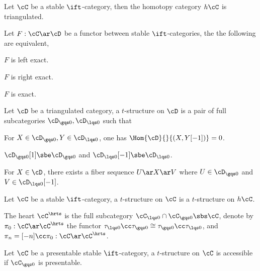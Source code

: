 \documentclass[a4paper, twoside]{article}
\begin{document}
\begin{thm}[1.1.2.14]

    Let $\cC$ be a stable $\ift$-category, then the homotopy category $h\cC$ is triangulated.

\end{thm}

\begin{thm}[1.1.4.1]
    Let $F:\cC\ar\cD$ be a functor between stable $\ift$-categories, the the following are equivalent,
    \begin{enr}[label=(\arabic*)]
        \item $F$ is left exact.
        \item $F$ is right exact.
        \item $F$ is exact.
    \end{enr}
\end{thm}


\begin{dfn}[1.2.1.1]
    Let $\cD$ be a triangulated category, a $t$-structure on $\cD$ is a pair of full subcategories $\cD_{\gqs0},\cD_{\lqs0}$ such that
    \begin{enr}[label=(\arabic*)]
        \item For $X\in\cD_{\gqs0}, Y\in\cD_{\lqs0}$, one has $\Hom{\cD}{}{(X,Y[-1])}=0$.
        \item $\cD_{\gqs0}[1]\sbe\cD_{\gqs0}$ and $\cD_{\lqs0}[-1]\sbe\cD_{\lqs0}$.
        \item For $X\in\cD$, there exists a fiber sequence $U\ar X\ar V$ where $U\in\cD_{\gqs0}$ and $V\in\cD_{\lqs0}[-1]$.
    \end{enr}
\end{dfn}


\begin{dfn}[1.2.1.4, 1.2.1.11]
    Let $\cC$ be a stable $\ift$-category, a $t$-structure on $\cC$ is a $t$-structure on $h\cC$.

    The heart $\cC^{\hrts}$ is the full subcategory $\cC_{\lqs0}\cap\cC_{\gqs0}\sbs\cC$, denote by $\pi_{0}:\cC\ar\cC^{\hrts}$ the functor $\tau_{\lqs0}\cc\tau_{\gqs0}\cong\tau_{\gqs0}\cc\tau_{\lqs0}$, and $\pi_{n}=[-n]\cc\pi_{0}:\cC\ar\cC^{\hrts}$.
\end{dfn}


\begin{thm}[1.4.4.12]
    Let $\cC$ be a presentable stable $\ift$-category, a $t$-structure on $\cC$ is accessible if $\cC_{\gqs0}$ is presentable.

\end{thm}
\end{document}
